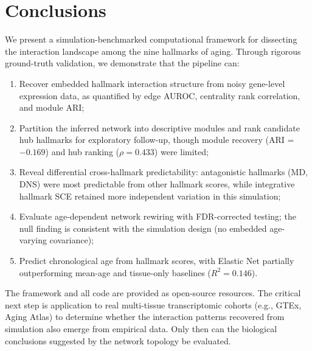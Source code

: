 \documentclass[11pt,a4paper]{article}
\begin{document}
\section{Conclusions}

We present a simulation-benchmarked computational framework for dissecting the interaction landscape among the nine hallmarks of aging. Through rigorous ground-truth validation, we demonstrate that the pipeline can:
\begin{enumerate}[noitemsep]
    \item Recover embedded hallmark interaction structure from noisy gene-level expression data, as quantified by edge AUROC, centrality rank correlation, and module ARI;
    \item Partition the inferred network into descriptive modules and rank candidate hub hallmarks for exploratory follow-up, though module recovery (ARI = $-0.169$) and hub ranking ($\rho = 0.433$) were limited;
    \item Reveal differential cross-hallmark predictability: antagonistic hallmarks (MD, DNS) were most predictable from other hallmark scores, while integrative hallmark SCE retained more independent variation in this simulation;
    \item Evaluate age-dependent network rewiring with FDR-corrected testing; the null finding is consistent with the simulation design (no embedded age-varying covariance);
    \item Predict chronological age from hallmark scores, with Elastic Net partially outperforming mean-age and tissue-only baselines ($R^2 = 0.146$).
\end{enumerate}
The framework and all code are provided as open-source resources. The critical next step is application to real multi-tissue transcriptomic cohorts (e.g., GTEx, Aging Atlas) to determine whether the interaction patterns recovered from simulation also emerge from empirical data. Only then can the biological conclusions suggested by the network topology be evaluated.



\end{document}

